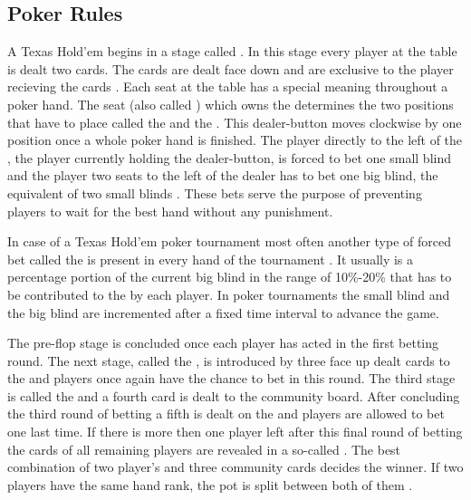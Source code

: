 \subsection{Poker Rules}
A Texas Hold'em  begins in a stage called . In this stage every player at the table is dealt two cards. The cards are dealt face down and are exclusive to the player recieving the cards \cite{billings_phd}. Each seat at the table has a special meaning throughout a poker hand. The seat (also called ) which owns the  determines the two positions that have to place   called the  and the . This dealer-button moves clockwise by one position once a whole poker hand is finished. The player directly to the left of the , the player currently holding the dealer-button, is forced to bet one small blind and the player two seats to the left of the dealer has to bet one big blind, the equivalent of two small blinds \cite{master_nuno}. These bets serve the purpose of preventing players to wait for the best hand without any punishment. \par In case of a Texas Hold'em poker tournament most often another type of forced bet called the  is present in every hand of the tournament \cite{poker_dummies}. It usually is a percentage portion of the current big blind in the range of 10\%-20\% that has to be contributed to the  by each player.
In poker tournaments the small blind and the big blind are incremented after a fixed time interval to advance the game.  \par
The pre-flop stage is concluded once each player has acted in the first betting round. The next stage, called the , is introduced by three face up dealt cards to the  and players once again have the chance to bet in this round. The third stage is called the  and a fourth card is dealt to the community board. After concluding the third round of betting a fifth  is dealt on the  and players are allowed to bet one last time. If there is more then one player left after this final round of betting the cards of all remaining players are revealed in a so-called . The best combination of two player's  and three community cards decides the winner. If two players have the same hand rank, the pot is split between both of them \cite{billings_phd}.
